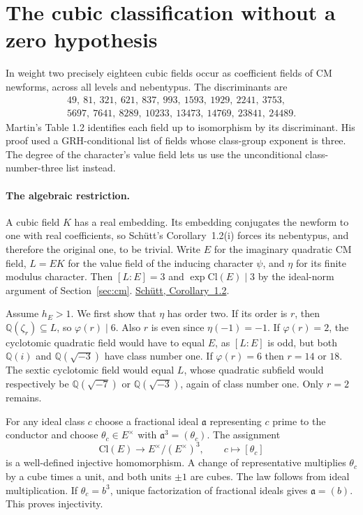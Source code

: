 \section{The cubic classification without a zero hypothesis}
\label{sec:class-three}

In weight two precisely eighteen cubic fields occur as coefficient
fields of CM newforms, across all levels and nebentypus. The
discriminants are
\[
\begin{gathered}
49,\ 81,\ 321,\ 621,\ 837,\ 993,\ 1593,\ 1929,\ 2241,\ 3753,\\
5697,\ 7641,\ 8289,\ 10233,\ 13473,\ 14769,\ 23841,\ 24489 .
\end{gathered}
\]
Martin's Table 1.2 identifies each field up to isomorphism by its
discriminant. His proof used a GRH-conditional list of fields whose
class-group exponent is three. The degree of the character's value
field lets us use the unconditional class-number-three list instead.

\paragraph{The algebraic restriction.}
A cubic field $K$ has a real embedding. Its embedding conjugates the
newform to one with real coefficients, so Sch\"utt's Corollary~1.2(i)
forces its nebentypus, and therefore the original one, to be trivial.
Write $E$ for the imaginary quadratic CM field, $L=EK$ for the
value field of the inducing character $\psi$, and $\eta$ for its finite
modulus character. Then $[L:E]=3$ and $\exp\mathrm{Cl}(E)\mid3$ by
the ideal-norm argument of Section~\ref{sec:cm}.
\href{https://arxiv.org/pdf/math/0511228}{Sch\"utt, Corollary~1.2}.

Assume $h_E>1$. We first show that $\eta$ has order two. If its order
is $r$, then $\mathbb Q(\zeta_r)\subseteq L$, so $\varphi(r)\mid6$.
Also $r$ is even since $\eta(-1)=-1$. If $\varphi(r)=2$, the cyclotomic
quadratic field would have to equal $E$, as $[L:E]$ is odd, but both
$\mathbb Q(i)$ and $\mathbb Q(\sqrt{-3})$ have class number one.
If $\varphi(r)=6$ then $r=14$ or $18$. The sextic cyclotomic field
would equal $L$, whose quadratic subfield would respectively be
$\mathbb Q(\sqrt{-7})$ or $\mathbb Q(\sqrt{-3})$, again of class
number one. Only $r=2$ remains.

For any ideal class $c$ choose a fractional ideal $\mathfrak a$
representing $c$ prime to the conductor and choose $\theta_c\in E^\times$
with $\mathfrak a^3=(\theta_c)$. The assignment
\[
\mathrm{Cl}(E)\longrightarrow E^\times/(E^\times)^3,\qquad
c\longmapsto [\theta_c]
\]
is a well-defined injective homomorphism. A change of representative
multiplies $\theta_c$ by a cube times a unit, and both units
$\pm1$ are cubes. The law follows from ideal multiplication.
If $\theta_c=b^3$, unique factorization of fractional ideals gives
$\mathfrak a=(b)$. This proves injectivity.

